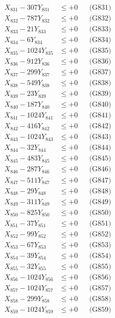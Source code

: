 \documentclass[a4paper,10pt]{article}
\begin{document}
{\begin{align}
\allowbreak
X_{831} - 307Y_{831} &\leq +0 && \text{(G831)} \\
X_{832} - 787Y_{832} &\leq +0 && \text{(G832)} \\
X_{833} - 21Y_{833} &\leq +0 && \text{(G833)} \\
X_{834} - 6Y_{834} &\leq +0 && \text{(G834)} \\
X_{835} - 1024Y_{835} &\leq +0 && \text{(G835)} \\
X_{836} - 912Y_{836} &\leq +0 && \text{(G836)} \\
X_{837} - 299Y_{837} &\leq +0 && \text{(G837)} \\
X_{838} - 549Y_{838} &\leq +0 && \text{(G838)} \\
X_{839} - 23Y_{839} &\leq +0 && \text{(G839)} \\
X_{840} - 187Y_{840} &\leq +0 && \text{(G840)} \\
\allowbreak
X_{841} - 1024Y_{841} &\leq +0 && \text{(G841)} \\
X_{842} - 416Y_{842} &\leq +0 && \text{(G842)} \\
X_{843} - 1024Y_{843} &\leq +0 && \text{(G843)} \\
X_{844} - 32Y_{844} &\leq +0 && \text{(G844)} \\
X_{845} - 483Y_{845} &\leq +0 && \text{(G845)} \\
X_{846} - 287Y_{846} &\leq +0 && \text{(G846)} \\
X_{847} - 511Y_{847} &\leq +0 && \text{(G847)} \\
X_{848} - 29Y_{848} &\leq +0 && \text{(G848)} \\
X_{849} - 311Y_{849} &\leq +0 && \text{(G849)} \\
X_{850} - 825Y_{850} &\leq +0 && \text{(G850)} \\
\allowbreak
X_{851} - 37Y_{851} &\leq +0 && \text{(G851)} \\
X_{852} - 99Y_{852} &\leq +0 && \text{(G852)} \\
X_{853} - 67Y_{853} &\leq +0 && \text{(G853)} \\
X_{854} - 39Y_{854} &\leq +0 && \text{(G854)} \\
X_{855} - 32Y_{855} &\leq +0 && \text{(G855)} \\
X_{856} - 1024Y_{856} &\leq +0 && \text{(G856)} \\
X_{857} - 1024Y_{857} &\leq +0 && \text{(G857)} \\
X_{858} - 299Y_{858} &\leq +0 && \text{(G858)} \\
X_{859} - 1024Y_{859} &\leq +0 && \text{(G859)} \\

\end{align}}
\end{document}
